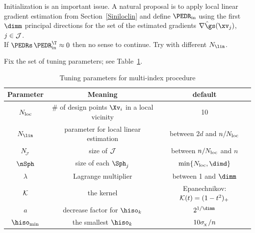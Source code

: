 \label{SinitSI}

Initialization is an important issue.
A natural proposal is to apply local linear gradient estimation
from Section~\ref{Siniloclin} and define 
\( \PEDR_{\init} \) using the first \( \dimm \) principal directions
for the set of the estimated gradients \( \hat{\nabla \gs}(\xv_{j}) \), \( j \in \mathcal{J} \).
\\
{\color{blue} 
If \( \PEDRs \, \PEDR_{\init}^{\T} \approx 0 \) then no sense to continue.
Try with different \( \numb_{\lin} \).}

\label{SEDRmiproc}


Fix the set of tuning parameters; see Table~\ref{TdefMI}.
\begin{table}[h]
\begin{tabular}{c|c|c}
        \hline
        Parameter & Meaning & default \\
        \hline
        \( N_{\operatorname{loc}} \) & \( \# \) of design points \( \Xv_{i} \) in a local vicinity & 10 \\
        \( \numb_{\lin} \) & parameter for local linear estimation & 
        between \( 2d \) and \( n/N_{\operatorname{loc}} \) \\
        \( N_{\!_{\mathcal{J}}} \) & size of \( \mathcal{J} \) 				& between \( n/N_{\operatorname{loc}} \) and \( n \) \\
		\( \nSph \) & size of each \( \Sph_{j} \)		& \( \min\{ \nmin, \dimd \} \) \\
		\( \lambda \) & Lagrange multiplier 		& between 1 and \( \dimm \) \\
		\( \mathcal{K} \) & the kernel & Epanechnikov: \( \mathcal{K}(t) = (1-t^{2})_{+} \) \\
		\( a \)	& decrease factor for \( \hiso_{k} \) & \( 2^{1/\dimm} \) \\
		\( \hiso_{\min} \) & the smallest \( \hiso_{k} \) & \( 10 \sigma_{\!_{X}}/n \) \\
		\hline
    \end{tabular}
\caption{Tuning parameters for multi-index procedure}    
\label{TdefMI}
\end{table}


